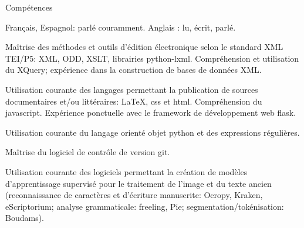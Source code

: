 











\begin{rubric}{Compétences}
                    \entry*
                    
                Français, Espagnol: parlé couramment. Anglais : lu, écrit, parlé.
                    \entry*
                    
                Maîtrise des méthodes et outils d'édition électronique selon le standard XML
                    TEI/P5: XML, ODD, XSLT, librairies python-lxml. Compréhension et utilisation du
                    XQuery; expérience dans la construction de bases de données XML.
                    \entry*
                    
                Utilisation courante des langages permettant la publication de sources
                    documentaires et/ou littéraires: \LaTeX, css et html. Compréhension du javascript.
                    Expérience ponctuelle avec le framework de développement web flask.
                    \entry*
                    
                Utilisation courante du langage orienté objet python et des expressions
                    régulières.
                    \entry*
                    
                Maîtrise du logiciel de contrôle de version git.
                    \entry*
                    
                Utilisation courante des logiciels permettant la création de modèles
                    d'apprentissage supervisé pour le traitement de l'image et du texte ancien
                    (reconnaissance de caractères et d'écriture manuscrite: Ocropy, Kraken, eScriptorium;
                    analyse grammaticale: freeling, Pie; segmentation/tokénisation: Boudams). \end{rubric}




